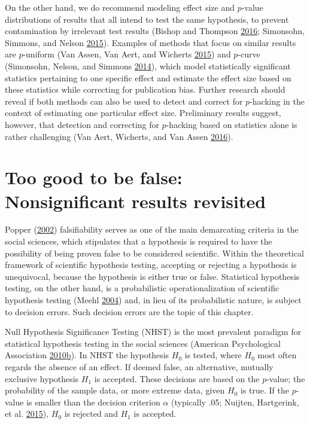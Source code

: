 \documentclass[a5paper]{book}
\begin{document}
On the other hand, we do recommend modeling effect size and \(p\)-value
distributions of results that all intend to test the same hypothesis, to
prevent contamination by irrelevant test results (Bishop and Thompson
\protect\hyperlink{ref-doi:10.7717ux2fpeerj.1715}{2016}; Simonsohn,
Simmons, and Nelson
\protect\hyperlink{ref-doi:10.1037ux2fxge0000104}{2015}). Examples of
methods that focus on similar results are \(p\)-uniform (Van Assen, Van
Aert, and Wicherts
\protect\hyperlink{ref-doi:10.1037ux2fmet0000025}{2015}) and \(p\)-curve
(Simonsohn, Nelson, and Simmons
\protect\hyperlink{ref-doi:10.1037ux2fa0033242}{2014}), which model
statistically significant statistics pertaining to one specific effect
and estimate the effect size based on these statistics while correcting
for publication bias. Further research should reveal if both methods can
also be used to detect and correct for \(p\)-hacking in the context of
estimating one particular effect size. Preliminary results suggest,
however, that detection and correcting for \(p\)-hacking based on
statistics alone is rather challenging (Van Aert, Wicherts, and Van
Assen \protect\hyperlink{ref-doi:10.1177ux2f1745691616650874}{2016}).

\chapter{Too good to be false: Nonsignificant results
revisited}\label{too-good-to-be-false-nonsignificant-results-revisited}

Popper (\protect\hyperlink{ref-isbn:9780415278430}{2002}) falsifiability
serves as one of the main demarcating criteria in the social sciences,
which stipulates that a hypothesis is required to have the possibility
of being proven false to be considered scientific. Within the
theoretical framework of scientific hypothesis testing, accepting or
rejecting a hypothesis is unequivocal, because the hypothesis is either
true or false. Statistical hypothesis testing, on the other hand, is a
probabilistic operationalization of scientific hypothesis testing (Meehl
\protect\hyperlink{ref-doi:10.1016ux2fj.appsy.2004.02.001}{2004}) and,
in lieu of its probabilistic nature, is subject to decision errors. Such
decision errors are the topic of this chapter.

Null Hypothesis Significance Testing (NHST) is the most prevalent
paradigm for statistical hypothesis testing in the social sciences
(American Psychological Association
\protect\hyperlink{ref-isbn:9781433805615}{2010}\protect\hyperlink{ref-isbn:9781433805615}{b}).
In NHST the hypothesis \(H_0\) is tested, where \(H_0\) most often
regards the absence of an effect. If deemed false, an alternative,
mutually exclusive hypothesis \(H_1\) is accepted. These decisions are
based on the \(p\)-value; the probability of the sample data, or more
extreme data, given \(H_0\) is true. If the \(p\)-value is smaller than
the decision criterion \(\alpha\) (typically .05; Nuijten, Hartgerink,
et al. \protect\hyperlink{ref-doi:10.3758ux2fs13428-015-0664-2}{2015}),
\(H_0\) is rejected and \(H_1\) is accepted.
\end{document}
